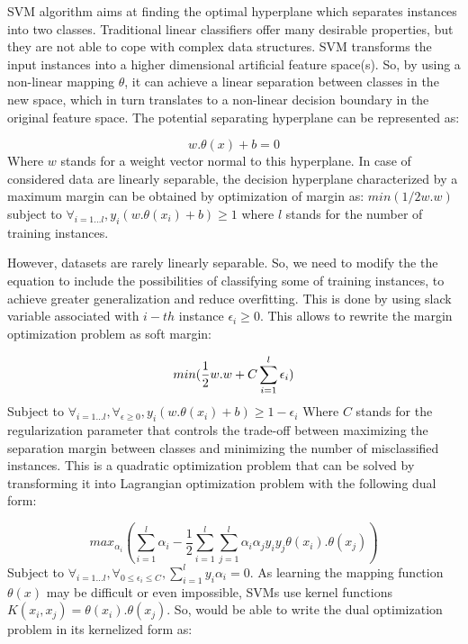 SVM algorithm aims at finding the optimal hyperplane which separates instances into two 
classes. Traditional linear classifiers offer many desirable properties, but they are not 
able to cope with complex data structures. SVM transforms the input instances into a higher 
dimensional artificial feature space(s). So, by using a non-linear mapping $\theta$, 
it can achieve a linear separation between classes in the new space, 
which in turn translates to a non-linear decision boundary in the original feature space. 
The potential separating hyperplane can be represented as:

\begin{equation}
    w.\theta(x)+b=0
    \label{eq:svmBasic}
\end{equation}
Where $w$ stands for a weight vector normal to this hyperplane. In case of considered data 
are linearly separable, the decision hyperplane characterized by a maximum margin can be 
obtained by optimization of margin as: $ min(1/2 w.w) $ subject to 
$\forall_{i=1...l}, y_{i}(w.\theta(x_{i})+b)\geq 1$ where $l$ stands for the number of training instances.

However, datasets are rarely linearly separable. So, we need to modify the 
the equation to include the possibilities of classifying some of training instances, 
to achieve greater generalization and reduce overfitting. This is 
done by using slack variable associated with $i-th$ instance $\epsilon_{i} \geq 0$. 
This allows to rewrite the margin optimization problem as soft margin:

\begin{equation}
    min(\frac{1}{2}w.w+C\sum_{i=1}^{l}\epsilon_{i}) \\
    \label{eq:svmSoftMargin}
\end{equation}
Subject to $\forall_{i=1...l}, \forall_{\epsilon\geq0}, y_{i}(w.\theta(x_{i})+b)\geq 1-\epsilon_{i}$
Where $C$ stands for the regularization parameter that controls the trade-off between maximizing 
the separation margin between classes and minimizing the number of misclassified instances.
This is a quadratic optimization problem that can be solved by transforming it into 
Lagrangian optimization problem with the following dual form:

\begin{equation}
    max_{\alpha_{i}} \left ( \sum_{i=1}^{l}\alpha_{i} - \frac{1}{2}\sum_{i=1}^{l}\sum_{j=1}^{l}\alpha_{i}\alpha_{j}y_{i}y_{j} \theta(x_{i}).\theta(x_{j}) \right )
    \label{eq:svmLagrange}
\end{equation}
Subject to $\forall_{i=1...l}, \forall_{0\leq\epsilon_{i} \leq C}, \sum_{i=1}^{l} y_{i}\alpha_{i}=0$. 
As learning the mapping function $\theta(x)$ may be difficult or even impossible, SVMs use kernel 
functions $K(x_{i},x_{j})=\theta(x_{i}).\theta(x_{j})$. So, would be able to write the dual optimization 
problem in its kernelized form as:


